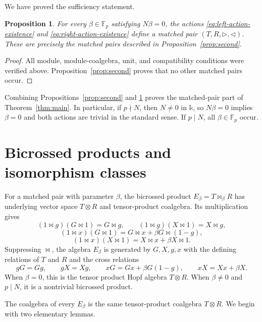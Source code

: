 \documentclass[twoside,11pt]{amsart}
\newtheorem{pro}[defi]{Proposition}
\newcommand{\K}{\mathds{k}}
\newcommand{\F}{\mathbb{F}}
\begin{document}
	We have proved the sufficiency statement.
	
	\begin{pro}\label{prop:existence}
		For every $\beta\in\F_p$ satisfying $N\beta=0$, the actions
		\eqref{eq:left-action-existence} and \eqref{eq:right-action-existence} define
		a matched pair $(T,R,\triangleright,\triangleleft)$. These are precisely the
		matched pairs described in Proposition~\ref{prop:second}.
	\end{pro}
	
	\begin{proof}
		All module, module-coalgebra, unit, and compatibility conditions were verified
		above. Proposition~\ref{prop:second} proves that no other matched pairs occur.
	\end{proof}
	
	Combining Propositions~\ref{prop:second} and \ref{prop:existence} proves the
	matched-pair part of Theorem~\ref{thm:main}. In particular, if $p\nmid N$,
	then $N\ne0$ in $\K$, so $N\beta=0$ implies $\beta=0$ and both actions are
	trivial in the standard sense. If $p\mid N$, all $\beta\in\F_p$ occur.
	
	\section{Bicrossed products and isomorphism classes}\label{sec:isom}
	
	For a matched pair with parameter $\beta$, the bicrossed product
	$E_\beta=T\bowtie_\beta R$ has underlying vector space $T\otimes R$ and
	tensor-product coalgebra. Its multiplication gives
	\[
	(1\bowtie g)(G\bowtie1)=G\bowtie g,
	\qquad
	(1\bowtie g)(X\bowtie1)=X\bowtie g,
	\]
	\[
	(1\bowtie x)(G\bowtie1)
	=G\bowtie x+\beta G\bowtie(1-g),
	\]
	\[
	(1\bowtie x)(X\bowtie1)
	=X\bowtie x+\beta X\bowtie1.
	\]
	Suppressing $\bowtie$, the algebra $E_\beta$ is generated by $G,X,g,x$ with
	the defining relations of $T$ and $R$ and the cross relations
	\begin{equation}\label{eq:cross-relations}
		gG=Gg,
		\qquad gX=Xg,
		\qquad xG=Gx+\beta G(1-g),
		\qquad xX=Xx+\beta X.
	\end{equation}
	When $\beta=0$, this is the tensor product Hopf algebra $T\otimes R$.
	When $\beta\ne0$ and $p\mid N$, it is a nontrivial bicrossed product.
	
	The coalgebra of every $E_\beta$ is the same tensor-product coalgebra
	$T\otimes R$. We begin with two elementary lemmas.
	
\end{document}
